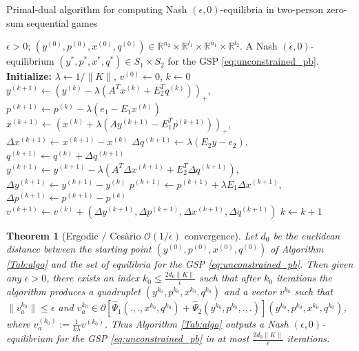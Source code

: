 \documentclass[a4paper,9pt]{extarticle}
\newtheorem{theorem}{Theorem}
\begin{document}
\begin{algorithm}
\caption{Primal-dual algorithm for computing Nash $(\epsilon,
  0)$-equilibria in two-person zero-sum sequential games}
\label{Tab:algo}
\begin{algorithmic}[1]
\Require $\epsilon > 0$; $(y^{(0)},p^{(0)},x^{(0)},q^{(0)}) \in \mathbb{R}^{n_2}
  \times \mathbb{R}^{l_1} \times \mathbb{R}^{n_1} \times
  \mathbb{R}^{l_2}$.
\Ensure A Nash $(\epsilon,0)$-equilibrium
$({y^*},{p^*},{x^*},{q^*}) \in S_1 \times S_2$ for
the GSP \eqref{eq:unconstrained_pb}.
\State  \textbf{Initialize:} $\lambda \leftarrow 1/\|K\|$, ${v}^{(0)}
\leftarrow 0$, $k \leftarrow 0$
\State $y^{(k + 1)} \leftarrow (y^{(k)} - \lambda (A^Tx^{(k)} +
E_2^Tq^{(k)}))_+$, \hspace{.5em}$p^{(k+1)} \leftarrow p^{(k)} -
\lambda(e_1-E_1x^{(k)})$
\State $x^{(k + 1)} \leftarrow (x^{(k)} + \lambda (Ay^{(k+1)} -
E_1^Tp^{(k+1)}))_+$, \hspace{.5em}$\Delta x^{(k+1)} \leftarrow
x^{(k+1)}-x^{(k)}$
\State $\Delta q^{(k+1)} \leftarrow \lambda (E_2y -
e_2)$, \hspace{.5em}$q^{(k+1)} \leftarrow q^{(k)} + \Delta q^{(k+1)}$
\State $y^{(k+1)} \leftarrow y^{(k+1)} - \lambda (A^T\Delta x^{(k+1)}
+ E_2^T\Delta q^{(k+1)})$, \hspace{.5em}$\Delta y^{(k+1)} \leftarrow
y^{(k+1)}-y^{(k)}$
\State $p^{(k+1)} \leftarrow p^{(k+1)} + \lambda E_1\Delta x^{(k+1)}$,
\hspace{.5em} $\Delta p^{(k+1)} \leftarrow p^{(k+1)}-p^{(k)}$
\State ${v}^{(k+1)} \leftarrow {v}^{(k)} + (\Delta
y^{(k+1)},\Delta p^{(k+1)},\Delta x^{(k+1)},\Delta q^{(k+1)})$ 
\State $k \leftarrow k + 1$
\EndWhile
\end{algorithmic}
\end{algorithm}

\begin{theorem}[Ergodic / Ces\`ario $\mathcal{O}(1/\epsilon)$ convergence]
Let $d_0$ be the euclidean distance between the starting point
$(y^{(0)},p^{(0)},x^{(0)},q^{(0)})$ of Algorithm \ref{Tab:algo} and the
set of equilibria for the GSP \eqref{eq:unconstrained_pb}.
Then given any $\epsilon > 0$, there exists an index
$k_0 \le \frac{2d_0\|K\|}{\epsilon}$ such that after $k_0$ iterations
the algorithm produces a quadruplet
$(y^{k_0},p^{k_0},x^{k_0},q^{k_0})$ and a vector $v^{k_0}$ such that
$\|v_a^{k_0}\| \le \epsilon$ and $v_a^{k_0} \in
\partial[\hat{\Psi}_1(., ., x^{k_0}, q^{k_0}) +
  \hat{\Psi}_2(y^{k_0}, p^{k_0}, ., .)](y^{k_0},p^{k_0},x^{k_0},q^{k_0})$,
where $v_a^{(k_0)} := \frac{1}{k\lambda}v^{(k_0)}$.
Thus Algorithm \ref{Tab:algo} outputs a Nash
$(\epsilon,0)$-equilibrium for the GSP \eqref{eq:unconstrained_pb}
in at most $\frac{2d_0\|K\|}{\epsilon}$ iterations.
\end{theorem}
\end{document}
